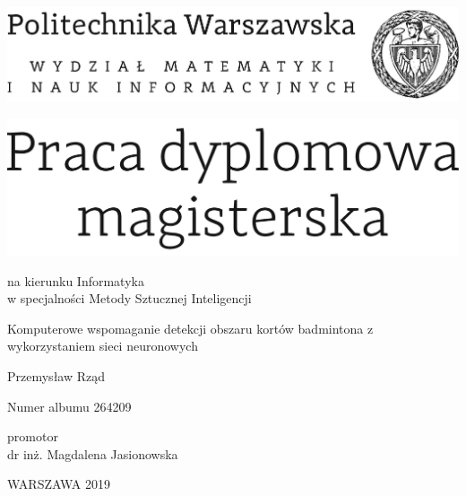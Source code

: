 \documentclass[12pt,twoside,a4paper]{article}
\newcommand{\discipline}{Informatyka}
\newcommand{\spec}{Metody Sztucznej Inteligencji} %
\renewcommand{\title}{Komputerowe wspomaganie detekcji obszaru kortów badmintona z wykorzystaniem sieci neuronowych}
\renewcommand{\author}{Przemysław Rząd}
\newcommand{\album}{264209}
\newcommand{\supervisor}{dr inż. Magdalena Jasionowska}
\renewcommand{\year}{2019}
\begin{document}
\pagestyle{empty}

\begin{center}
\includegraphics[scale=1.]{img/politechnika} 
\vspace{70pt}


\includegraphics[scale=1.]{img/praca_mgr} %

{ \arial na kierunku \discipline
\\ w specjalności \spec %

\vspace{40pt}
{\arial \large \title}

\vspace{50pt}

{\arial \huge \author}

\vspace{5pt}

Numer albumu \album

\vspace{40pt}

promotor \\
{\arial \supervisor}

\vspace{15pt}
 

 \vfill
WARSZAWA \year \\
}
\end{center}
\end{document}

